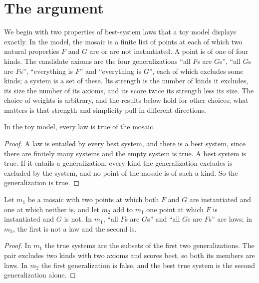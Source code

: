 \documentclass{situationist-preprint}
\begin{document}
\section{The argument}\label{s:argument}

We begin with two properties of best-system laws that a toy model displays exactly. In the model, the mosaic is a finite list of points at each of which two natural properties $F$ and $G$ are or are not instantiated. A point is of one of four kinds. The candidate axioms are the four generalizations \enquote{all $F$s are $G$s}, \enquote{all $G$s are $F$s}, \enquote{everything is $F$} and \enquote{everything is $G$}, each of which excludes some kinds; a system is a set of these. Its strength is the number of kinds it excludes, its size the number of its axioms, and its score twice its strength less its size. The choice of weights is arbitrary, and the results below hold for other choices; what matters is that strength and simplicity pull in different directions.

\begin{proposition}\label{p:true}
In the toy model, every law is true of the mosaic.
\end{proposition}

\begin{proof}
A law is entailed by every best system, and there is a best system, since there are finitely many systems and the empty system is true. A best system is true. If it entails a generalization, every kind the generalization excludes is excluded by the system, and no point of the mosaic is of such a kind. So the generalization is true.
\end{proof}

\begin{proposition}\label{p:global}
Let $m_1$ be a mosaic with two points at which both $F$ and $G$ are instantiated and one at which neither is, and let $m_2$ add to $m_1$ one point at which $F$ is instantiated and $G$ is not. In $m_1$, \enquote{all $F$s are $G$s} and \enquote{all $G$s are $F$s} are laws; in $m_2$, the first is not a law and the second is.
\end{proposition}

\begin{proof}
In $m_1$ the true systems are the subsets of the first two generalizations. The pair excludes two kinds with two axioms and scores best, so both its members are laws. In $m_2$ the first generalization is false, and the best true system is the second generalization alone.
\end{proof}
\end{document}

